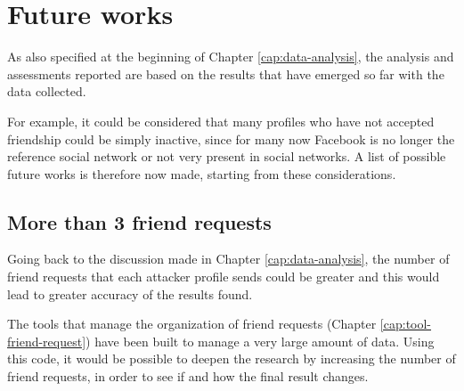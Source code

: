 
\chapter{Future works}
\label{cap:future-works}
As also specified at the beginning of Chapter \ref{cap:data-analysis}, the analysis and assessments reported are based on the results that have emerged so far with the data collected. \par \noindent For example, it could be considered that many profiles who have not accepted friendship could be simply inactive, since for many now Facebook is no longer the reference social network or not very present in social networks.
A list of possible future works is therefore now made, starting from these considerations.

\section{More than 3 friend requests}
Going back to the discussion made in Chapter \ref{cap:data-analysis}, the number of friend requests that each attacker profile sends could be greater and this would lead to greater accuracy of the results found. \par \noindent The tools that manage the organization of friend requests (Chapter \ref{cap:tool-friend-request}) have been built to manage a very large amount of data. Using this code, it would be possible to deepen the research by increasing the number of friend requests, in order to see if and how the final result changes.

